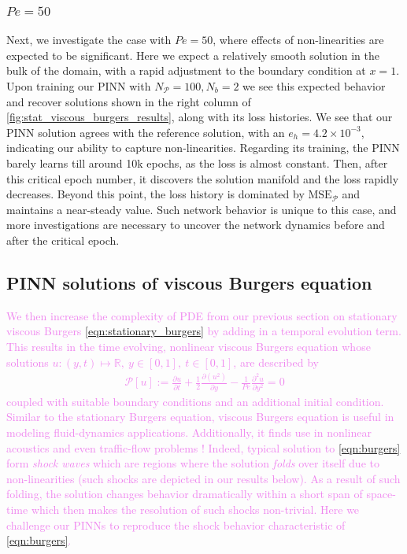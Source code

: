 \documentclass[11pt]{article}
\newcommand{\mse}{\textrm{MSE}}
\newcommand{\pde}{\ensuremath{\mathcal{P}}}
\newcommand{\newcontent}[1]{\textcolor{violet}{#1}}
\begin{document}
\subsubsection{\(Pe = 50\)}
\label{sec:org6a6f34d}
Next, we investigate the case with \(Pe = 50\), where effects of
non-linearities are expected to be significant. Here we expect a relatively
smooth solution in the bulk of the domain, with a rapid adjustment to the boundary
condition at \(x = 1\). Upon training our PINN with \(N_\pde = 100 , N_b = 2\) we
see this expected behavior and recover solutions shown in the right column of
\cref{fig:stat_viscous_burgers_results}, along with its loss histories.
We see that our PINN solution agrees with the reference solution,
with an \(e_h = 4.2 \times 10^{-3}\), indicating our ability to capture
non-linearities. Regarding its training, the PINN barely learns till around 10k epochs,
as the loss is almost constant. Then, after this
critical epoch number, it discovers
the solution manifold and the loss rapidly decreases. Beyond this
point, the loss history is dominated by \(\mse_\pde\) and maintains a near-steady value. Such network behavior is unique to this case, and
more investigations are necessary to uncover the network dynamics before and
after the critical epoch.

\subsection{PINN solutions of viscous Burgers equation}
\label{sec:burgers}
\newcontent{
We then increase the complexity of PDE from our previous section on
stationary viscous Burgers \cref{eqn:stationary_burgers} by adding in a temporal
evolution term. This results in the time evolving, nonlinear viscous Burgers
equation whose solutions \(u : (y, t) \mapsto \mathbb{R},~y \in [0, 1],~t \in [0, 1]\),
are described by
\begin{equation}
\label{eqn:burgers}
\begin{aligned}
	 \pde[ u ] := \frac{\partial u}{\partial t} + \frac{1}{2}\frac{\partial \left(u^2\right)}{\partial y} - \frac{1}{Pe}\frac{\partial^2 u}{\partial y^2} = 0
\end{aligned}
\end{equation}
coupled with suitable boundary conditions and an additional initial condition. Similar to the stationary Burgers
equation, viscous Burgers equation is useful in modeling fluid-dynamics applications.
Additionally, it finds use in nonlinear acoustics and even traffic-flow
problems \cite{miroe2017}! Indeed, typical solution to \cref{eqn:burgers} form
\emph{shock waves} which are regions where the solution \emph{folds} over itself due to
non-linearities (such shocks are depicted in our results below). As a result
of such folding, the
solution changes behavior dramatically within a short span of space-time
which then makes the resolution of such shocks non-trivial. Here we challenge
our PINNs to reproduce the shock behavior characteristic of \cref{eqn:burgers}.
}
\end{document}
